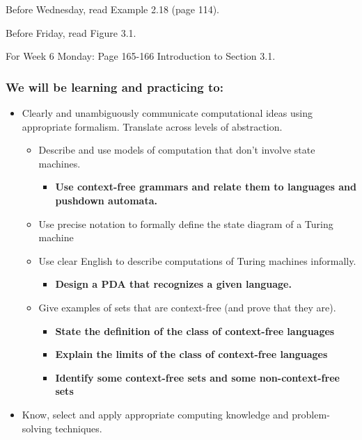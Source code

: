 Before Wednesday, read Example 2.18 (page 114).

Before Friday, read Figure 3.1.

For Week 6 Monday: Page 165-166 Introduction to Section 3.1.

\vspace{-20pt}

\subsubsection*{We will be learning and practicing to:}
\vspace{-20pt}

\begin{itemize}
    \item Clearly and unambiguously communicate computational ideas using appropriate formalism. Translate across levels of abstraction.
    \begin{itemize}
        \item Describe and use models of computation that don't involve state machines.
        \begin{itemize}
            \item {\bf Use context-free grammars and relate them to languages and pushdown automata.}
        \end{itemize}
        \item Use precise notation to formally define the state diagram of a Turing machine
        \item Use clear English to describe computations of Turing machines informally.
        \begin{itemize}
            \item {\bf Design a PDA that recognizes a given language.}
         \end{itemize}
       \item Give examples of sets that are context-free (and prove that they are).
       \begin{itemize}
          \item {\bf State the definition of the class of context-free languages}
          \item {\bf Explain the limits of the class of context-free languages}
          \item {\bf Identify some context-free sets and some non-context-free sets}
       \end{itemize}
    \end{itemize}
    \item Know, select and apply appropriate computing knowledge and problem-solving techniques. 

\end{itemize}
